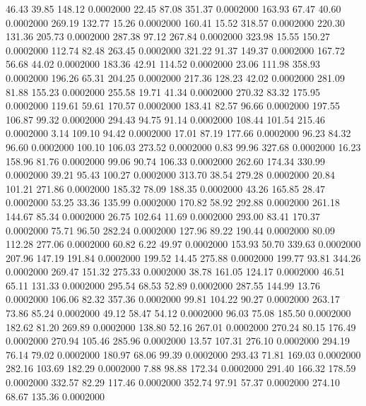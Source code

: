   46.43   39.85  148.12   0.0002000
  22.45   87.08  351.37   0.0002000
 163.93   67.47   40.60   0.0002000
 269.19  132.77   15.26   0.0002000
 160.41   15.52  318.57   0.0002000
 220.30  131.36  205.73   0.0002000
 287.38   97.12  267.84   0.0002000
 323.98   15.55  150.27   0.0002000
 112.74   82.48  263.45   0.0002000
 321.22   91.37  149.37   0.0002000
 167.72   56.68   44.02   0.0002000
 183.36   42.91  114.52   0.0002000
  23.06  111.98  358.93   0.0002000
 196.26   65.31  204.25   0.0002000
 217.36  128.23   42.02   0.0002000
 281.09   81.88  155.23   0.0002000
 255.58   19.71   41.34   0.0002000
 270.32   83.32  175.95   0.0002000
 119.61   59.61  170.57   0.0002000
 183.41   82.57   96.66   0.0002000
 197.55  106.87   99.32   0.0002000
 294.43   94.75   91.14   0.0002000
 108.44  101.54  215.46   0.0002000
   3.14  109.10   94.42   0.0002000
  17.01   87.19  177.66   0.0002000
  96.23   84.32   96.60   0.0002000
 100.10  106.03  273.52   0.0002000
   0.83   99.96  327.68   0.0002000
  16.23  158.96   81.76   0.0002000
  99.06   90.74  106.33   0.0002000
 262.60  174.34  330.99   0.0002000
  39.21   95.43  100.27   0.0002000
 313.70   38.54  279.28   0.0002000
  20.84  101.21  271.86   0.0002000
 185.32   78.09  188.35   0.0002000
  43.26  165.85   28.47   0.0002000
  53.25   33.36  135.99   0.0002000
 170.82   58.92  292.88   0.0002000
 261.18  144.67   85.34   0.0002000
  26.75  102.64   11.69   0.0002000
 293.00   83.41  170.37   0.0002000
  75.71   96.50  282.24   0.0002000
 127.96   89.22  190.44   0.0002000
  80.09  112.28  277.06   0.0002000
  60.82    6.22   49.97   0.0002000
 153.93   50.70  339.63   0.0002000
 207.96  147.19  191.84   0.0002000
 199.52   14.45  275.88   0.0002000
 199.77   93.81  344.26   0.0002000
 269.47  151.32  275.33   0.0002000
  38.78  161.05  124.17   0.0002000
  46.51   65.11  131.33   0.0002000
 295.54   68.53   52.89   0.0002000
 287.55  144.99   13.76   0.0002000
 106.06   82.32  357.36   0.0002000
  99.81  104.22   90.27   0.0002000
 263.17   73.86   85.24   0.0002000
  49.12   58.47   54.12   0.0002000
  96.03   75.08  185.50   0.0002000
 182.62   81.20  269.89   0.0002000
 138.80   52.16  267.01   0.0002000
 270.24   80.15  176.49   0.0002000
 270.94  105.46  285.96   0.0002000
  13.57  107.31  276.10   0.0002000
 294.19   76.14   79.02   0.0002000
 180.97   68.06   99.39   0.0002000
 293.43   71.81  169.03   0.0002000
 282.16  103.69  182.29   0.0002000
   7.88   98.88  172.34   0.0002000
 291.40  166.32  178.59   0.0002000
 332.57   82.29  117.46   0.0002000
 352.74   97.91   57.37   0.0002000
 274.10   68.67  135.36   0.0002000
